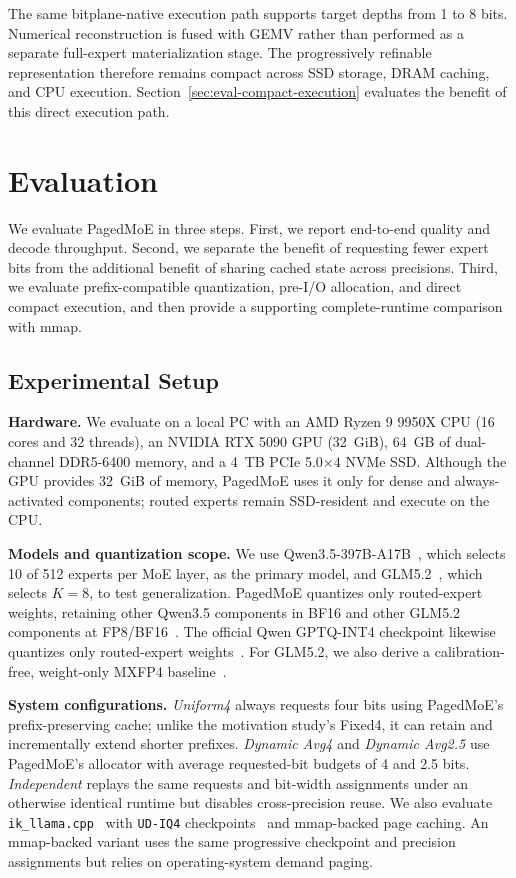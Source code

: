 \documentclass[sigconf, nonacm]{acmart}
\begin{document}
The same bitplane-native execution path supports target depths from
1 to 8 bits. Numerical reconstruction is fused with GEMV rather than
performed as a separate full-expert materialization stage. The
progressively refinable representation therefore remains compact
across SSD storage, DRAM caching, and CPU execution.
Section~\ref{sec:eval-compact-execution} evaluates the benefit of this
direct execution path.


\section{Evaluation}
\label{sec:evaluation}

We evaluate PagedMoE in three steps. First, we report end-to-end
quality and decode throughput. Second, we separate the benefit of
requesting fewer expert bits from the additional benefit of sharing
cached state across precisions. Third, we evaluate prefix-compatible
quantization, pre-I/O allocation, and direct compact execution, and then provide a supporting complete-runtime comparison with mmap.


\subsection{Experimental Setup}
\label{sec:eval-setup}

\noindent\textbf{Hardware.}
We evaluate on a local PC with an AMD Ryzen 9 9950X CPU
(16 cores and 32 threads), an NVIDIA RTX 5090 GPU (32~GiB),
64~GB of dual-channel DDR5-6400 memory, and a 4~TB PCIe
5.0\(\times4\) NVMe SSD. Although the GPU provides 32~GiB of memory, PagedMoE uses it only for dense and always-activated components; routed experts remain SSD-resident and execute on the CPU.

\noindent\textbf{Models and quantization scope.}
We use Qwen3.5-397B-A17B~\cite{qwen35_397b}, which selects 10 of
512 experts per MoE layer, as the primary model, and GLM5.2~\cite{glm52},
which selects \(K=8\), to test generalization. PagedMoE quantizes only
routed-expert weights, retaining other Qwen3.5 components in BF16 and
other GLM5.2 components at FP8/BF16~\cite{glm52_fp8}. The official Qwen GPTQ-INT4 checkpoint likewise quantizes only
routed-expert weights~\cite{qwen35_397b_gptq_int4,gptq}. For GLM5.2, we also
derive a calibration-free, weight-only MXFP4 baseline~\cite{rouhani2023microscalingdataformatsdeep}.

\noindent\textbf{System configurations.}
\emph{Uniform4} always requests four bits using PagedMoE's
prefix-preserving cache; unlike the motivation study's Fixed4, it can
retain and incrementally extend shorter prefixes. \emph{Dynamic Avg4}
and \emph{Dynamic Avg2.5} use PagedMoE's allocator with average
requested-bit budgets of 4 and 2.5 bits.
\emph{Independent} replays the same requests and bit-width assignments
under an otherwise identical runtime but disables cross-precision reuse. We also evaluate \texttt{ik\_llama.cpp}~\cite{ik_llama_cpp}
with \texttt{UD-IQ4} checkpoints~\cite{qwen35_ud_iq4_xs,glm52_ud_iq4_xs} and mmap-backed page caching.
An mmap-backed variant uses the same progressive checkpoint and
precision assignments but relies on operating-system demand paging.
\end{document}

